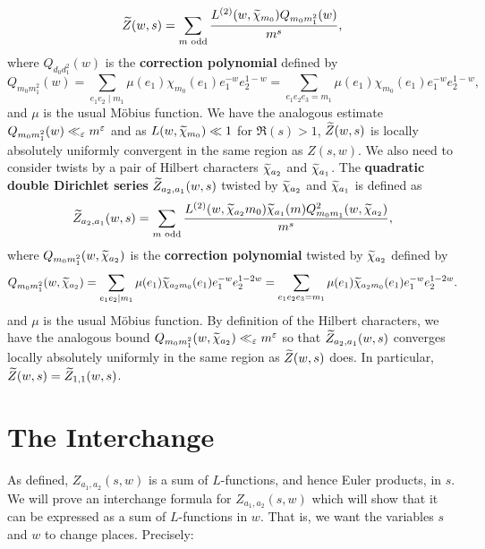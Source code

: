 \documentclass[12pt,reqno,oneside]{amsart}
\begin{document}
    \[
        \widetilde{Z}(w,s) = \sum_{\text{$m$ odd}}\frac{L^{(2)}(w,\widetilde{\chi}_{m_{0}})Q_{m_{0}m_{1}^{2}}(w)}{m^{s}},
    \]
    where $Q_{d_{0}d_{1}^{2}}(w)$ is the \textbf{correction polynomial} defined by
    \[
        Q_{m_{0}m_{1}^{2}}(w) = \sum_{e_{1}e_{2} \mid m_{1}}\mu(e_{1})\chi_{m_{0}}(e_{1})e_{1}^{-w}e_{2}^{1-w} = \sum_{e_{1}e_{2}e_{3} = m_{1}}\mu(e_{1})\chi_{m_{0}}(e_{1})e_{1}^{-w}e_{2}^{1-w},
    \]
    and $\mu$ is the usual M\"obius function. We have the analogous estimate $Q_{m_{0}m_{1}^{2}}(w) \ll_{\varepsilon} m^{\varepsilon}$ and as $L(w,\widetilde{\chi}_{m_{0}}) \ll 1$ for $\Re(s) > 1$, $\widetilde{Z}(w,s)$ is locally absolutely uniformly convergent in the same region as $Z(s,w)$. We also need to consider twists by a pair of Hilbert characters $\widetilde{\chi}_{a_{2}}$ and $\widetilde{\chi}_{a_{1}}$. The \textbf{quadratic double Dirichlet series} $\widetilde{Z}_{a_{2},a_{1}}(w,s)$ twisted by $\widetilde{\chi}_{a_{2}}$ and $\widetilde{\chi}_{a_{1}}$ is defined as
    \[
        \widetilde{Z}_{a_{2},a_{1}}(w,s) = \sum_{\text{$m$ odd}}\frac{L^{(2)}(w,\widetilde{\chi}_{a_{2}}m_{0})\widetilde{\chi}_{a_{1}}(m)Q_{m_{0}m_{1}}^{2}(w,\widetilde{\chi}_{a_{2}})}{m^{s}},
    \]
    where $Q_{m_{0}m_{1}^{2}}(w,\widetilde{\chi}_{a_{2}})$ is the \textbf{correction polynomial} twisted by $\widetilde{\chi}_{a_{2}}$ defined by
    \[
        Q_{m_{0}m_{1}^{2}}(w,\widetilde{\chi}_{a_{2}}) = \sum_{e_{1}e_{2} \mid m_{1}}\mu(e_{1})\widetilde{\chi}_{a_{2}m_{0}}(e_{1})e_{1}^{-w}e_{2}^{1-2w} = \sum_{e_{1}e_{2}e_{3} = m_{1}}\mu(e_{1})\widetilde{\chi}_{a_{2}m_{0}}(e_{1})e_{1}^{-w}e_{2}^{1-2w}.
    \]
    and $\mu$ is the usual M\"obius function. By definition of the Hilbert characters, we have the analogous bound $Q_{m_{0}m_{1}^{2}}(w,\widetilde{\chi}_{a_{2}}) \ll_{\varepsilon} m^{\varepsilon}$ so that $\widetilde{Z}_{a_{2},a_{1}}(w,s)$ converges locally absolutely uniformly in the same region as $\widetilde{Z}(w,s)$ does. In particular, $\widetilde{Z}(w,s) = \widetilde{Z}_{1,1}(w,s)$.
\section*{The Interchange}
    As defined, $Z_{a_{1},a_{2}}(s,w)$ is a sum of $L$-functions, and hence Euler products, in $s$. We will prove an interchange formula for $Z_{a_{1},a_{2}}(s,w)$ which will show that it can be expressed as a sum of $L$-functions in $w$. That is, we want the variables $s$ and $w$ to change places. Precisely:
\end{document}
